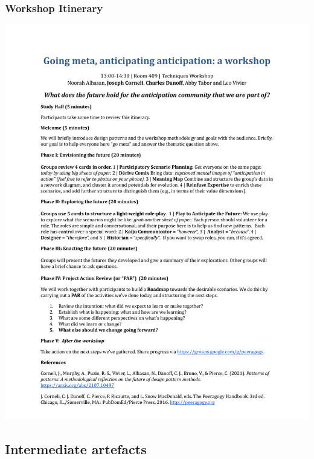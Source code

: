 \documentclass[acmlarge,timestamp]{acmart}
\begin{document}
\clearpage

\subsubsection{Workshop Itinerary}\label{first-workshop-itinerary}

\begin{mdframed}[backgroundcolor=blue!50,linecolor=blue!50]
  \noindent\includegraphics[width=\textwidth,trim={1cm 4.5cm 1cm 4.5cm},clip=true]{anticipation}
\end{mdframed}

\clearpage

\subsection{Intermediate artefacts}
\end{document}
